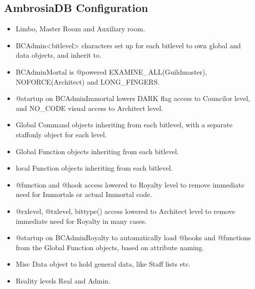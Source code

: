 \documentclass[letterpaper,10pt,english]{sphinxmanual}
\begin{document}
\subsection{AmbrosiaDB Configuration}
\label{\detokenize{ambrosiadb:ambrosiadb-configuration}}\begin{itemize}
\item {} 
\sphinxAtStartPar
Limbo, Master Room and Auxiliary room.

\item {} 
\sphinxAtStartPar
BC\sphinxhyphen{}Admin\sphinxhyphen{}\textless{}bitlevel\textgreater{} characters set up for each bitlevel to own global and
data objects, and inherit to.

\item {} 
\sphinxAtStartPar
BC\sphinxhyphen{}Admin\sphinxhyphen{}Mortal is @powered EXAMINE\_ALL(Guildmaster), NOFORCE(Architect) and
LONG\_FINGERS.

\item {} 
\sphinxAtStartPar
@startup on BC\sphinxhyphen{}Admin\sphinxhyphen{}Immortal lowers DARK flag access to Councilor level, and
NO\_CODE visual access to Architect level.

\item {} 
\sphinxAtStartPar
Global Command objects inheriting from each bitlevel, with a separate staff\sphinxhyphen{}only object for each level.

\item {} 
\sphinxAtStartPar
Global Function objects inheriting from each bitlevel.

\item {} 
\sphinxAtStartPar
local Function objects inheriting from each bitlevel.

\item {} 
\sphinxAtStartPar
@function and @hook access lowered to Royalty level to remove immediate need
for Immortals or actual Immortal code.

\item {} 
\sphinxAtStartPar
@rxlevel, @txlevel, bittype() access lowered to Architect level to remove
immediate need for Royalty in many cases.

\item {} 
\sphinxAtStartPar
@startup on BC\sphinxhyphen{}Admin\sphinxhyphen{}Royalty to automatically load @hooks and @functions from
the Global Function objects, based on attribute naming.

\item {} 
\sphinxAtStartPar
Misc Data object to hold general data, like Staff lists etc.

\item {} 
\sphinxAtStartPar
Reality levels \textquotesingle{}Real\textquotesingle{} and \textquotesingle{}Admin\textquotesingle{}.

\end{itemize}
\end{document}
